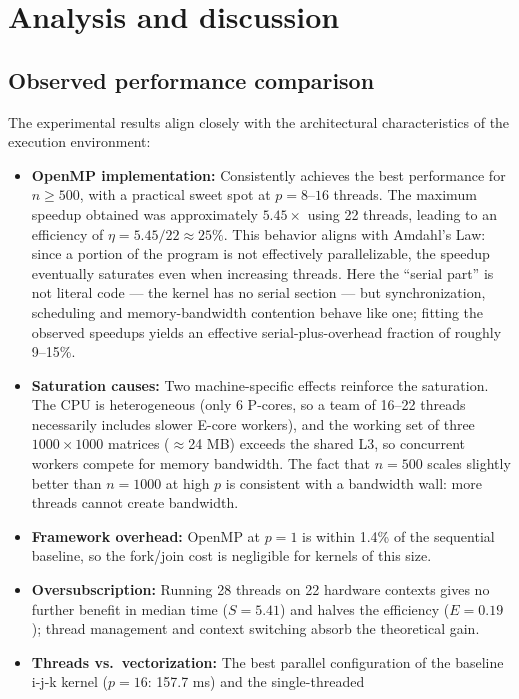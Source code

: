 \documentclass[12pt,a4paper]{article}
\begin{document}
\section{Analysis and discussion}
\label{sec:discussion}

\subsection{Observed performance comparison}
\label{sec:perfcompare}

The experimental results align closely with the architectural
characteristics of the execution environment:
\begin{itemize}
\item \textbf{OpenMP implementation:} Consistently achieves the best
performance for $n \geq 500$, with a practical sweet spot at
$p = 8$--$16$ threads. The maximum speedup obtained was approximately
$5.45\times$ using 22 threads, leading to an efficiency of
$\eta = 5.45 / 22 \approx 25\%$. This behavior aligns with Amdahl's Law:
since a portion of the program is not effectively parallelizable, the
speedup eventually saturates even when increasing threads. Here the
``serial part'' is not literal code --- the kernel has no serial section ---
but synchronization, scheduling and memory-bandwidth contention behave like
one; fitting the observed speedups yields an effective serial-plus-overhead
fraction of roughly 9--15\%.
\item \textbf{Saturation causes:} Two machine-specific effects reinforce the
saturation. The CPU is heterogeneous (only 6 P-cores, so a team of 16--22
threads necessarily includes slower E-core workers), and the working set of
three $1000 \times 1000$ matrices ($\approx$24 MB) exceeds the shared L3, so
concurrent workers compete for memory bandwidth. The fact that $n = 500$
scales slightly better than $n = 1000$ at high $p$ is consistent with a
bandwidth wall: more threads cannot create bandwidth.
\item \textbf{Framework overhead:} OpenMP at $p = 1$ is within 1.4\% of the
sequential baseline, so the fork/join cost is negligible for kernels of this
size.
\item \textbf{Oversubscription:} Running 28 threads on 22 hardware contexts
gives no further benefit in median time ($S = 5.41$) and halves the
efficiency ($E = 0.19$); thread management and context switching absorb the
theoretical gain.
\item \textbf{Threads vs.\ vectorization:} The best parallel configuration
of the baseline i-j-k kernel ($p = 16$: 157.7 ms) and the single-threaded

\end{itemize}
\end{document}
